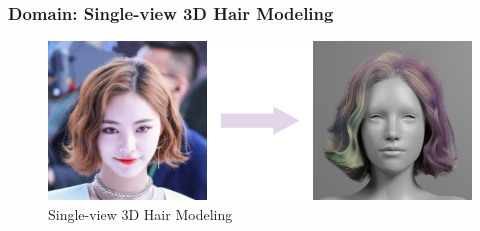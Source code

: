 \begin{frame}
    \frametitle{Domain: Single-view 3D Hair Modeling}
    \begin{figure}[H]
        \centering
        \includegraphics[width=0.8\linewidth]{assets/figures/task-intro.png}
        \caption{Single-view 3D Hair Modeling}
        \label{fig:task-intro}
    \end{figure}
\end{frame}